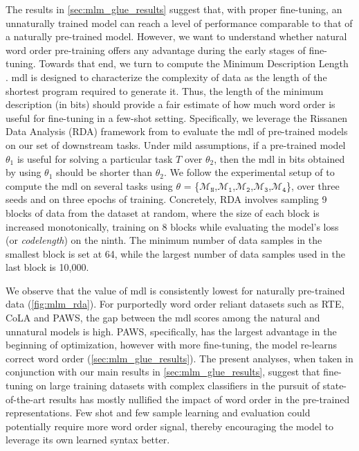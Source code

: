 \documentclass[letterpaper, 12pt]{report}
\newcommand{\OR}{$\mathcal{M}_{\texttt{N}}$}
\newcommand{\RI}{$\mathcal{M}_{\texttt{1}}$}
\newcommand{\RII}{$\mathcal{M}_{\texttt{2}}$}
\newcommand{\RIII}{$\mathcal{M}_{\texttt{3}}$}
\newcommand{\RIV}{$\mathcal{M}_{\texttt{4}}$}
\begin{document}
The results in \autoref{sec:mlm_glue_results} suggest that, with proper fine-tuning, an unnaturally trained model can reach a level of performance comparable to that of a naturally pre-trained model. However, we want to understand whether natural word order pre-training offers any advantage during the early stages of fine-tuning. Towards that end, we turn to compute the Minimum Description Length \cite[\acrshort{mdl}; ][]{rissanen1984universal}. \acrshort{mdl} is designed to characterize the complexity of data as the length of the shortest program required to generate it. Thus, the length of the minimum description (in bits) should provide a fair estimate of how much word order is useful for fine-tuning in a few-shot setting. Specifically, we leverage the Rissanen Data Analysis (RDA) framework from \citet{perez2021} to evaluate the \acrshort{mdl} of pre-trained models on our set of downstream tasks. Under mild assumptions, if a pre-trained model $\theta_1$ is useful for solving a particular task $T$ over $\theta_2$, then the \acrshort{mdl} in bits obtained by using $\theta_1$ should be shorter than $\theta_2$.
We follow the experimental setup of \citeauthor{perez2021} to compute the \acrshort{mdl} on several tasks using $\theta$ = \{\OR,\RI,\RII,\RIII,\RIV\}, over three seeds and on three epochs of training. Concretely, RDA involves sampling 9 blocks of data from the dataset at random, where the size of each block is increased monotonically, training on 8 blocks while evaluating the model's loss (or \textit{codelength}) on the ninth. The minimum number of data samples in the smallest block is set at 64, while the largest number of data samples used in the last block is 10,000.

We observe that the value of \acrshort{mdl} is consistently lowest for naturally pre-trained data (\autoref{fig:mlm_rda}). For purportedly word order reliant datasets such as RTE, CoLA and PAWS, the gap between the \acrshort{mdl} scores among the natural and unnatural models is high. PAWS, specifically, has the largest advantage in the beginning of optimization, however with more fine-tuning, the model re-learns correct word order (\autoref{sec:mlm_glue_results}). The present analyses, when taken in conjunction with our main results in \autoref{sec:mlm_glue_results}, suggest that fine-tuning on large training datasets with complex classifiers in the pursuit of state-of-the-art results has mostly nullified the impact of word order in the pre-trained representations. Few shot \citep{bansal-etal-2020-learning} and few sample \citep{zhang2021a} learning and evaluation could potentially require more word order signal, thereby encouraging the model to leverage its own learned syntax better.
\end{document}
